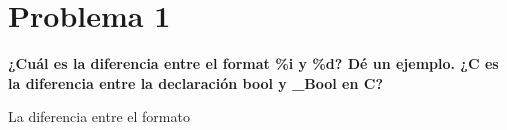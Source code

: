 \section*{Problema 1}
\textbf{¿Cuál es la diferencia entre el format \%i y \%d? Dé un ejemplo. ¿C es la diferencia entre la declaración bool y \_Bool en C?}

La diferencia entre el formato